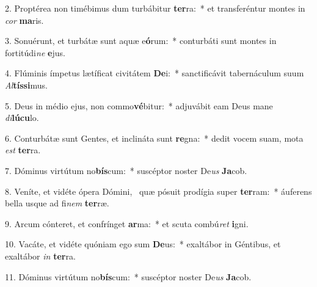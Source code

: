 2. Proptérea non timébimus dum turbábitur \textbf{ter}ra:~*  et transferéntur montes in \textit{cor} \textbf{ma}ris.\

3. Sonuérunt, et turbátæ sunt aquæ e\textbf{ó}rum:~*  conturbáti sunt montes in fortitúdi\textit{ne} \textbf{e}jus.\

4. Flúminis ímpetus lætíficat civitátem \textbf{De}i:~*  sanctificávit tabernáculum suum \textit{Al}\textbf{tís}\textbf{si}mus.\

5. Deus in médio ejus, non commo\textbf{vé}bitur:~*  adjuvábit eam Deus mane \textit{di}\textbf{lú}\textbf{cu}lo.\

6. Conturbátæ sunt Gentes, et inclináta sunt \textbf{re}gna:~*  dedit vocem suam, mota \textit{est} \textbf{ter}ra.\

7. Dóminus virtútum no\textbf{bís}cum:~*  suscéptor noster De\textit{us} \textbf{Ja}cob.\

8. Veníte, et vidéte ópera Dómini, \dag\  quæ pósuit prodígia super \textbf{ter}ram:~*  áuferens bella usque ad fi\textit{nem} \textbf{ter}ræ.\

9. Arcum cónteret, et confrínget \textbf{ar}ma:~*  et scuta combú\textit{ret} \textbf{i}gni.\

10. Vacáte, et vidéte quóniam ego sum \textbf{De}us:~*  exaltábor in Géntibus, et exaltábor \textit{in} \textbf{ter}ra.\

11. Dóminus virtútum no\textbf{bís}cum:~*  suscéptor noster De\textit{us} \textbf{Ja}cob.\

